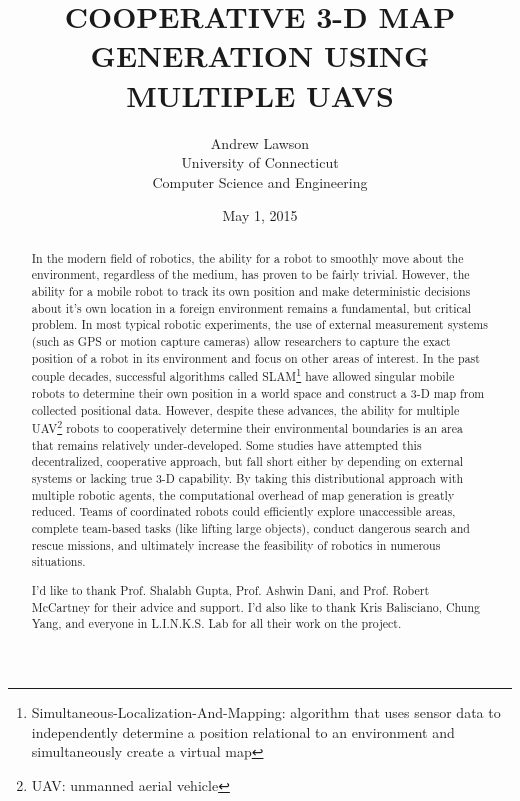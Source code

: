 \documentclass[letterpaper, oneside, 10pt]{report}
\title{\large COOPERATIVE 3-D MAP GENERATION USING MULTIPLE UAVS}
\author{
  \large
  Andrew Lawson \\
  University of Connecticut \\
  Computer Science and Engineering
}
\date{\large May 1, 2015}
\begin{document}
\begin{titlepage}
  \maketitle
  \thispagestyle{empty}
\end{titlepage}
\clearpage

\begin{abstract}
  In the modern field of robotics, the ability for a robot to smoothly move about the environment, regardless of the medium, has proven to be fairly trivial. However, the ability for a mobile robot to track its own position and make deterministic decisions about it's own location in a foreign environment remains a fundamental, but critical problem. In most typical robotic experiments, the use of external measurement systems (such as GPS or motion capture cameras) allow researchers to capture the exact position of a robot in its environment and focus on other areas of interest. In the past couple decades, successful algorithms called SLAM\footnote{Simultaneous-Localization-And-Mapping: algorithm that uses sensor data to independently determine a position relational to an environment and simultaneously create a virtual map} have allowed singular mobile robots to determine their own position in a world space and construct a 3-D map from collected positional data. However, despite these advances, the ability for multiple UAV\footnote{UAV: unmanned aerial vehicle} robots to cooperatively determine their environmental boundaries is an area that remains relatively under-developed. Some studies have attempted this decentralized, cooperative approach, but fall short either by depending on external systems or lacking true 3-D capability. By taking this distributional approach with multiple robotic agents, the computational overhead of map generation is greatly reduced. Teams of coordinated robots could efficiently explore unaccessible areas, complete team-based tasks (like lifting large objects), conduct dangerous search and rescue missions, and ultimately increase the feasibility of robotics in numerous situations.
\end{abstract}
\clearpage

\renewcommand{\abstractname}{Acknowledgements}
\begin{abstract}
 I'd like to thank Prof. Shalabh Gupta, Prof. Ashwin Dani, and Prof. Robert McCartney for their advice and support. I'd also like to thank Kris Balisciano, Chung Yang, and everyone in L.I.N.K.S. Lab for all their work on the project.
\end{abstract}
\clearpage
\end{document}
